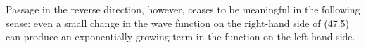 Passage in the reverse direction, however, ceases to be meaningful in the following sense: even a small change in the wave function on the right-hand side of (47.5) can produce an exponentially growing term in the function on the left-hand side.
